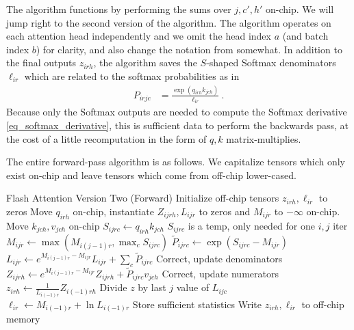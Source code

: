 \documentclass[11pt]{article}
\begin{document}
The algorithm functions by performing the sums over $ j, c', h' $  on-chip. We will jump
right to the second version of the algorithm.  The algorithm operates on each attention head
independently and we omit the head index $ a $ (and batch index $ b $) for clarity, and also change
the notation from \cite{dao2023flashattention2} somewhat. In addition to the final outputs $ z _{ irh } $,
the algorithm saves the $ S $-shaped Softmax denominators $ \ell _{ ir } $  which are related to the
softmax probabilities as in
\begin{align}
    P _{ irjc } &= \frac{  \exp \left (   q _{ irh } k _{ jch }\right)}{ \ell _{ ir } } \ .
\end{align}
Because only the Softmax outputs are needed to compute the Softmax derivative \eqref{eq_softmax_derivative},
this is sufficient data to perform the backwards pass, at the cost of a little recomputation in the form
of $ q, k $ matrix-multiplies.



The entire forward-pass algorithm is as follows. We capitalize tensors which only exist on-chip and
leave tensors which come from off-chip lower-cased.

\begin{algo}{Flash Attention Version Two (Forward)}
\State Initialize off-chip tensors $ z _{ irh },  \ell _{ ir }$ to zeros
    \State Move  $ q _{ irh }$ on-chip, instantiate $Z _{ ijrh }, L _{ ijr }$ to zeros and $M _{ ijr }$ to $ -\infty $ on-chip.
    \State Move  $ k_{ jch },v _{ jch }$ on-chip
    \State $ S _{ ijrc } \gets q _{ irh } k _{ jch } $  \Comment $ S _{ ijrc } $ is a temp, only needed for one $ i,j $ iter
    \State $ M _{ ijr }  \gets \max(M _{ i(j-1)r },  \max _{ c } S _{ ijrc } ) $
    \State $ \tilde{P} _{ ijrc} \gets \exp \left ( S _{ ijrc } - M _{ ijr } \right ) $
    \State $ L _{ ijr }  \gets e^{ M _{ i(j-1)r } - M _{ ijr }}L _{ ijr } + \sum _{ c }\tilde{P} _{ ijrc }$ \Comment Correct, update denominators
    \State $ Z _{ ijrh } \gets   e^{ M _{ i(j-1)r } - M _{ ijr } }Z _{ ijrh } +\tilde{P} _{ ijrc}v _{ jch }$ \Comment Correct, update numerators
\EndFor
\State $ z _{ irh } \gets \frac{1}{L _{ i(-1)r }} Z _{ i(-1)rh }$ \Comment Divide $ z $ by last $ j  $ value of $ L _{ ijc } $
    \State $ \ell _{ ir } \gets M _{ i(-1)r }+\ln L _{ i(-1)r }$ \Comment Store sufficient statistics
    \State Write  $z _{ irh } ,  \ell _{ ir }$ to off-chip memory
\EndFor

\label{algo_fa_v2}
\end{algo}
\end{document}
